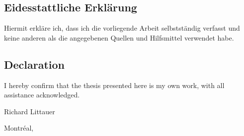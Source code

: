 \documentclass[12pt,a4paper]{article}
\begin{document}


\newpage

\thispagestyle{empty}
\noindent\subsection*{Eidesstattliche Erkl\"arung}

\noindent Hiermit erkl\"are ich, dass ich die vorliegende Arbeit selbstst\"andig verfasst und keine anderen als die angegebenen Quellen und Hilfsmittel verwendet habe.\\

\noindent\subsection*{Declaration}

\noindent I hereby confirm that the thesis presented here is my own work, with all assistance acknowledged. \\

\vspace{1cm}

\noindent Richard Littauer

\vspace{.5cm}

\noindent Montr\'eal, \thedate



\newpage



\newpage

%
\tableofcontents
\thispagestyle{empty}

\newpage
\thispagestyle{empty}
\setcounter{page}{0}
\listoffigures
\setcounter{page}{0}
\listoftables
\thispagestyle{empty}
\newpage

\hypersetup{pageanchor=true}
\setcounter{page}{1}

\onehalfspacing
\end{document}
